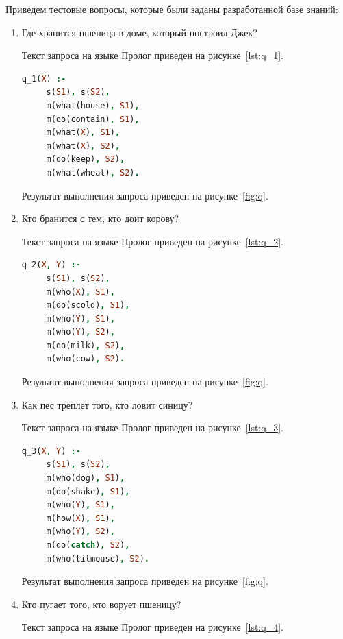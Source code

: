 Приведем тестовые вопросы, которые были заданы разработанной базе знаний:
\begin{enumerate}
\item Где хранится пшеница в доме, который построил Джек?

  Текст запроса на языке Пролог приведен на рисунке~\ref{lst:q_1}.

  \begin{lstlisting}[style=source_code,language=prolog,
    caption=Текст запроса,label=lst:q_1]
 q_1(X) :-
     s(S1), s(S2),
     m(what(house), S1),
     m(do(contain), S1),
     m(what(X), S1),
     m(what(X), S2),
     m(do(keep), S2),
     m(what(wheat), S2).
  \end{lstlisting}

  Результат выполнения запроса приведен на рисунке~\ref{fig:q}.

\item Кто бранится с тем, кто доит корову?

  Текст запроса на языке Пролог приведен на рисунке~\ref{lst:q_2}.

  \begin{lstlisting}[style=source_code,language=prolog,
    caption=Текст запроса,label=lst:q_2]
 q_2(X, Y) :-
     s(S1), s(S2),
     m(who(X), S1),
     m(do(scold), S1),
     m(who(Y), S1),
     m(who(Y), S2),
     m(do(milk), S2),
     m(who(cow), S2).
  \end{lstlisting}

  Результат выполнения запроса приведен на рисунке~\ref{fig:q}.

\newpage

\item Как пес треплет того, кто ловит синицу?

  Текст запроса на языке Пролог приведен на рисунке~\ref{lst:q_3}.

  \begin{lstlisting}[style=source_code,language=prolog,
    caption=Текст запроса,label=lst:q_3]
 q_3(X, Y) :-
     s(S1), s(S2),
     m(who(dog), S1),
     m(do(shake), S1),
     m(who(Y), S1),
     m(how(X), S1),
     m(who(Y), S2),
     m(do(catch), S2),
     m(who(titmouse), S2).
  \end{lstlisting}

  Результат выполнения запроса приведен на рисунке~\ref{fig:q}.

\item Кто пугает того, кто ворует пшеницу?

  Текст запроса на языке Пролог приведен на рисунке~\ref{lst:q_4}.


\end{enumerate}
